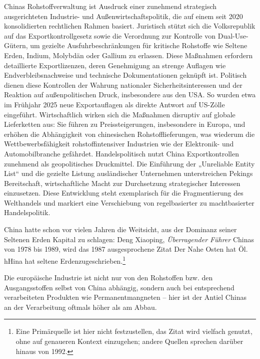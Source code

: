 \documentclass[12pt,a4paper,oneside]{book} %
\begin{document}
Chinas Rohstoffverwaltung ist Ausdruck einer zunehmend strategisch ausgerichteten Industrie- und Außenwirtschaftspolitik, die auf einem seit 2020 konsolidierten rechtlichen Rahmen basiert. Juristisch stützt sich die Volksrepublik auf das Exportkontrollgesetz sowie die Verordnung zur Kontrolle von Dual-Use-Gütern, um gezielte Ausfuhrbeschränkungen für kritische Rohstoffe wie Seltene Erden, Indium, Molybdän oder Gallium zu erlassen. Diese Maßnahmen erfordern detaillierte Exportlizenzen, deren Genehmigung an strenge Auflagen wie Endverbleibsnachweise und technische Dokumentationen geknüpft ist. Politisch dienen diese Kontrollen der Wahrung nationaler Sicherheitsinteressen und der Reaktion auf außenpolitischen Druck, insbesondere aus den USA. So wurden etwa im Frühjahr 2025 neue Exportauflagen als direkte Antwort auf US-Zölle eingeführt. Wirtschaftlich wirken sich die Maßnahmen disruptiv auf globale Lieferketten aus: Sie führen zu Preissteigerungen, insbesondere in Europa, und erhöhen die Abhängigkeit von chinesischen Rohstofflieferungen, was wiederum die Wettbewerbsfähigkeit rohstoffintensiver Industrien wie der Elektronik- und Automobilbranche gefährdet. Handelspolitisch nutzt China Exportkontrollen zunehmend als geopolitisches Druckmittel. Die Einführung der „Unreliable Entity List“ und die gezielte Listung ausländischer Unternehmen unterstreichen Pekings Bereitschaft, wirtschaftliche Macht zur Durchsetzung strategischer Interessen einzusetzen. Diese Entwicklung steht exemplarisch für die Fragmentierung des Welthandels und markiert eine Verschiebung von regelbasierter zu machtbasierter Handelspolitik.

China hatte schon vor vielen Jahren die Weitsicht,\autocite[Siehe insbesondere zum Hintergrund des Aufbaus der chinesischen Seltenerdmetallwirtschaft]{https://www.nytimes.com/2025/07/05/business/china-rare-earth-history.html} aus der Dominanz seiner Seltenen Erden Kapital zu schlagen: Deng Xiaoping, \textit{Überragender Führer} Chinas von 1978 bis 1989, wird das 1987 ausgesprochene Zitat \glqq Der Nahe Osten hat Öl. hHina hat seltene Erden\grqq zugeschrieben.\footnote{Eine Primärquelle ist hier nicht festzustellen, das Zitat wird vielfach genutzt, ohne auf genaueren Kontext einzugehen; andere Quellen sprechen darüber hinaus von 1992.}

Die europäische Industrie ist nicht nur von den Rohstoffen bzw. den Ausgangsstoffen selbst von China abhängig, sondern auch bei entsprechend verarbeiteten Produkten wie Permanentmangneten -- hier ist der Antiel Chinas an der Verarbeitung oftmals höher als am Abbau.
\end{document}

